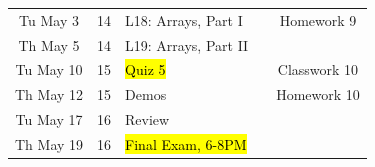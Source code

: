 \documentclass[letter,11pt]{article}
\begin{document}
\begin{tabular}{c c l l c}
Tu May 3 & 14 & L18: Arrays, Part I & & Homework 9 \\
Th May 5 & 14 & L19: Arrays, Part II  &  &  \\
Tu May 10 & 15 & \hl{Quiz 5} & & Classwork 10 \\
Th May 12 & 15 & Demos &  & Homework 10 \\
Tu May 17 & 16 & Review & \\
Th May 19 & 16 & \hl{Final Exam, 6-8PM} & \\
\end{tabular}
\fi



\end{document}
